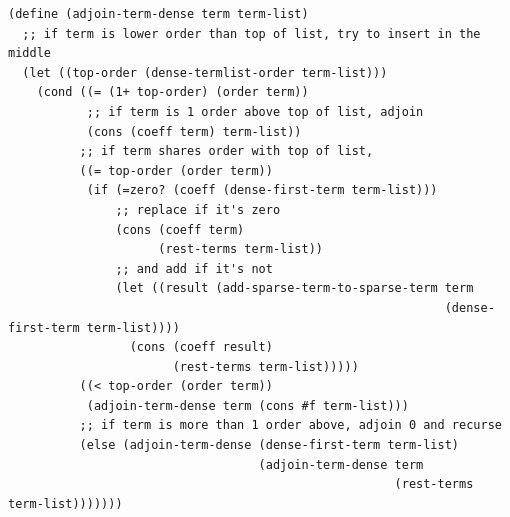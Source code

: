 \documentclass[final,fleqn,titlepage,twoside]{article}
\begin{document}
\begin{verbatim}
(define (adjoin-term-dense term term-list)
  ;; if term is lower order than top of list, try to insert in the middle
  (let ((top-order (dense-termlist-order term-list)))
    (cond ((= (1+ top-order) (order term))
           ;; if term is 1 order above top of list, adjoin
           (cons (coeff term) term-list))
          ;; if term shares order with top of list, 
          ((= top-order (order term))
           (if (=zero? (coeff (dense-first-term term-list)))
               ;; replace if it's zero
               (cons (coeff term)
                     (rest-terms term-list))
               ;; and add if it's not
               (let ((result (add-sparse-term-to-sparse-term term
                                                             (dense-first-term term-list))))
                 (cons (coeff result)
                       (rest-terms term-list)))))
          ((< top-order (order term))
           (adjoin-term-dense term (cons #f term-list)))
          ;; if term is more than 1 order above, adjoin 0 and recurse
          (else (adjoin-term-dense (dense-first-term term-list)
                                   (adjoin-term-dense term
                                                      (rest-terms term-list)))))))


\end{verbatim}
\end{document}
